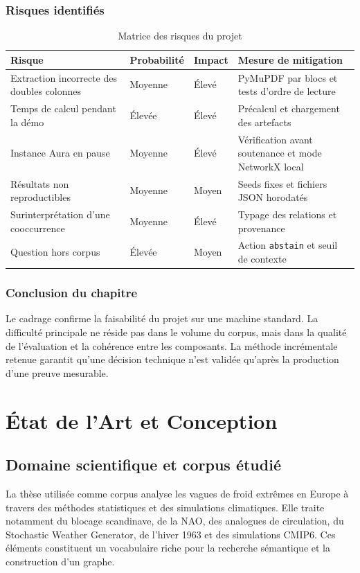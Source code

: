 \documentclass[12pt,a4paper,oneside]{report}
\newcommand{\tech}[1]{\texttt{#1}}
\begin{document}
\subsection{Risques identifiés}
\begin{table}[H]
\centering
\caption{Matrice des risques du projet}
\begin{tabularx}{\textwidth}{p{}p{}p{}X}
\toprule
\textbf{Risque} & \textbf{Probabilité} & \textbf{Impact} & \textbf{Mesure de mitigation}\\
\midrule
Extraction incorrecte des doubles colonnes & Moyenne & Élevé & PyMuPDF par blocs et tests d'ordre de lecture\\
Temps de calcul pendant la démo & Élevée & Élevé & Précalcul et chargement des artefacts\\
Instance Aura en pause & Moyenne & Élevé & Vérification avant soutenance et mode NetworkX local\\
Résultats non reproductibles & Moyenne & Moyen & Seeds fixes et fichiers JSON horodatés\\
Surinterprétation d'une cooccurrence & Moyenne & Élevé & Typage des relations et provenance\\
Question hors corpus & Élevée & Moyen & Action \tech{abstain} et seuil de contexte\\
\bottomrule
\end{tabularx}
\end{table}

\subsection{Conclusion du chapitre}
Le cadrage confirme la faisabilité du projet sur une machine standard. La difficulté principale ne réside pas dans le volume du corpus, mais dans la qualité de l'évaluation et la cohérence entre les composants. La méthode incrémentale retenue garantit qu'une décision technique n'est validée qu'après la production d'une preuve mesurable.

\chapter{État de l'Art et Conception}

\section{Domaine scientifique et corpus étudié}
La thèse utilisée comme corpus analyse les vagues de froid extrêmes en Europe à travers des méthodes statistiques et des simulations climatiques. Elle traite notamment du blocage scandinave, de la NAO, des analogues de circulation, du Stochastic Weather Generator, de l'hiver 1963 et des simulations CMIP6. Ces éléments constituent un vocabulaire riche pour la recherche sémantique et la construction d'un graphe.
\end{document}
